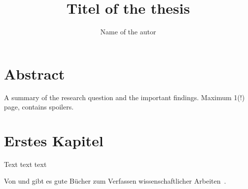 \documentclass[doctype=bachelorsthesis,lang=ngerman,BCOR=15mm,biblatex]{ldvbook}
\begin{document}
\title{Titel of the thesis}
\author{Name of the autor}


\maketitle[frontcover=Design1]


\chapter*{Abstract}

A summary of the research question and the important findings.
Maximum 1(!) page, contains spoilers.


\tableofcontents






\chapter{Erstes Kapitel}

Text text text

Von \textcite[deutsch]{Niederhauser2006} und
\textcite[englisch]{Gustavii2003} gibt es gute Bücher zum Verfassen
wissenschaftlicher Arbeiten~\cite{Gustavii2003}.


\printbibliography{}
\end{document}
